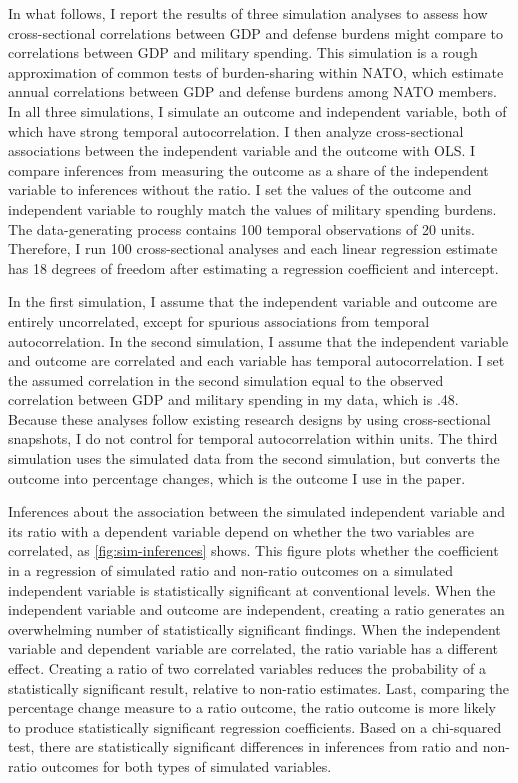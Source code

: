 \documentclass[12pt]{article}
\begin{document}
In what follows, I report the results of three simulation analyses to assess how cross-sectional correlations between GDP and defense burdens might compare to correlations between GDP and military spending. 
This simulation is a rough approximation of common tests of burden-sharing within NATO, which estimate annual correlations between GDP and defense burdens among NATO members. 
In all three simulations, I simulate an outcome and independent variable, both of which have strong temporal autocorrelation. 
I then analyze cross-sectional associations between the independent variable and the outcome with OLS. 
I compare inferences from measuring the outcome as a share of the independent variable to inferences without the ratio. 
I set the values of the outcome and independent variable to roughly match the values of military spending burdens. 
The data-generating process contains 100 temporal observations of 20 units. 
Therefore, I run 100 cross-sectional analyses and each linear regression estimate has 18 degrees of freedom after estimating a regression coefficient and intercept.  

 
In the first simulation, I assume that the independent variable and outcome are entirely uncorrelated, except for spurious associations from temporal autocorrelation. 
In the second simulation, I assume that the independent variable and outcome are correlated and each variable has temporal autocorrelation. 
I set the assumed correlation in the second simulation equal to the observed correlation between GDP and military spending in my data, which is .48. 
Because these analyses follow existing research designs by using cross-sectional snapshots, I do not control for temporal autocorrelation within units. 
The third simulation uses the simulated data from the second simulation, but converts the outcome into percentage changes, which is the outcome I use in the paper. 


Inferences about the association between the simulated independent variable and its ratio with a dependent variable depend on whether the two variables are correlated, as \autoref{fig:sim-inferences} shows. 
This figure plots whether the coefficient in a regression of simulated ratio and non-ratio outcomes on a simulated independent variable is statistically significant at conventional levels. 
When the independent variable and outcome are independent, creating a ratio generates an overwhelming number of statistically significant findings. 
When the independent variable and dependent variable are correlated, the ratio variable has a different effect. 
Creating a ratio of two correlated variables reduces the probability of a statistically significant result, relative to non-ratio estimates. 
Last, comparing the percentage change measure to a ratio outcome, the ratio outcome is more likely to produce statistically significant regression coefficients. 
Based on a chi-squared test, there are statistically significant differences in inferences from ratio and non-ratio outcomes for both types of simulated variables.
\end{document}
